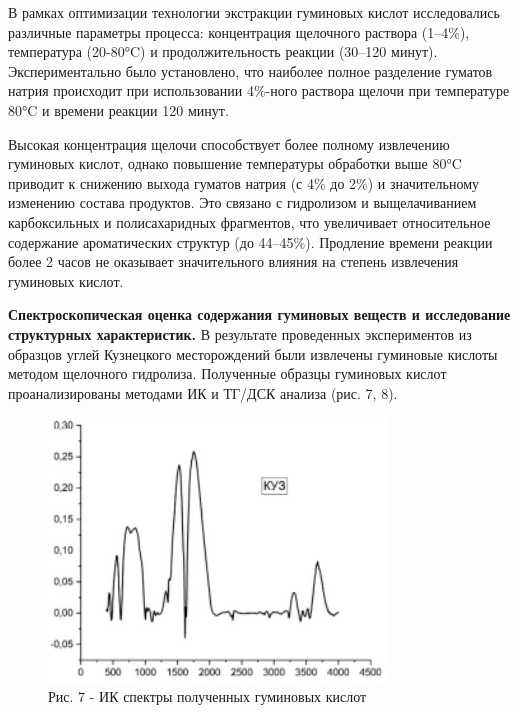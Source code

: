 \begin{multicols}{2}
В рамках оптимизации технологии экстракции гуминовых кислот
исследовались различные параметры процесса: концентрация щелочного
раствора (1--4\%), температура (20-80°C) и продолжительность реакции
(30--120 минут). Экспериментально было установлено, что наиболее полное
разделение гуматов натрия происходит при использовании 4\%-ного раствора
щелочи при температуре 80°C и времени реакции 120 минут.

Высокая концентрация щелочи способствует более полному извлечению
гуминовых кислот, однако повышение температуры обработки выше 80°C
приводит к снижению выхода гуматов натрия (с 4\% до 2\%) и значительному
изменению состава продуктов. Это связано с гидролизом и выщелачиванием
карбоксильных и полисахаридных фрагментов, что увеличивает относительное
содержание ароматических структур (до 44--45\%). Продление времени
реакции более 2 часов не оказывает значительного влияния на степень
извлечения гуминовых кислот.

{\bfseries Спектроскопическая оценка содержания гуминовых веществ и
исследование структурных характеристик.} В результате проведенных
экспериментов из образцов углей Кузнецкого месторождений были извлечены
гуминовые кислоты методом щелочного гидролиза. Полученные образцы
гуминовых кислот проанализированы методами ИК и ТГ/ДСК анализа (рис. 7,
8).
\end{multicols}

\begin{figure}[H]
	\centering
	\includegraphics[width=0.8\textwidth]{media/gorn3/image18}
	\caption*{Рис. 7 - ИК спектры полученных гуминовых кислот}
\end{figure}

